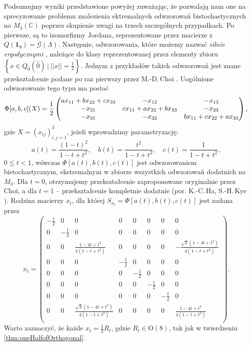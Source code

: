 \label{com:onlyOneExample}
Podsumujmy wyniki przedstawione powyżej zuważając, że pozwalają nam one
na sprecyzowanie problemu znalezienia ektremalnych odwzorowań bistochastycznych
no $M_{3}(\mathbb{C})$ poprzez skupienie uwagi na trzech szczególnych
przypadkach.
Po pierwsze, są to izomorfizmy Jordana, reprezentowane przez macierze z
$Q(\mathbf{1}_{8}) = \mathcal{G}(\Lambda)$.
Następnie, odwzorowania, które możemy nazwać \emph{silnie ergodycznymi}
\cite{miller2015stable},
należące do klasy reprezentowanej przez elementy zbioru
$\left \{ x \in Q_{0}(\hat{0}) \:|\: ||x|| = \frac{1}{2} \right \}$.
Jednym z przykładów takich odwzorowań jest znane przekształcenie podane
po raz pierwszy przez M.-D.\,Choi \cite{choi1977extremal}.
Uogólnione odwzorowanie tego typu ma postać
\begin{equation}\label{eq:choi}
\Phi[a,b,c](X)=\\
\frac{1}{2}
\begin{pmatrix}
ax_{11}+bx_{22}+cx_{33} & -x_{12} & -x_{13} \\
-x_{21} & cx_{11}+ax_{22}+bx_{33} & -x_{23} \\
-x_{31} & -x_{32} & bx_{11}+cx_{22}+ax_{33}
\end{pmatrix},
\end{equation}
gzie $X = (x_{ij})_{i,j = 1}^{3}$,
jeżeli wprowadzimy parametryzację:
\begin{equation}
 a(t)=\dfrac{(1-t)^2}{1-t+t^2},\quad b(t)=\dfrac{t^2}{1-t+t^2},\quad c(t)=\dfrac 1{1-t+t^2},
\end{equation}
$0 \leq t < 1$,
wówczas $\Phi[a(t), b(t), c(t)]$ jest odwzorowaniem bistochastycznym, ekstremalnym
w zbiorze wszystkich odwzorowań dodatnich na $M_{3}$.
Dla $t = 0$, otrzymujemy przekształcenie zaproponowane oryginalnie przez Choi,
a dla $t = 1$ -- przekształcenie kompletnie dodatnie
(por.
K.-C.\,Ha, S.-H.\,Kye \cite{ha2011entanglement}).
Rodzina macierzy $x_{t}$, dla której
$S_{x_{t}} = \Phi[a(t), b(t), c(t)]$ jest zadana przez
\begin{equation}
 x_{t} = \begin{pmatrix}
     - \frac{1}{2} & 0 & 0 & 0 & 0 & 0 & 0 & 0 \\
     0 & - \frac{1}{2} & 0 & 0 & 0 & 0 & 0 & 0 \\
     0 & 0 & \frac{1 - 4t + t^{2}}{4(1 - t + t^{2})} & 0 & 0 & 0 & 0 & - \frac{\sqrt{3}(1 - 4t + t^{2})}{4(1 - t + t^{2})} \\
     0 & 0 & 0 & - \frac{1}{2} & 0 & 0 & 0 & 0 \\
     0 & 0 & 0 & 0 & - \frac{1}{2} & 0 & 0 & 0 \\
     0 & 0 & 0 & 0 & 0 & - \frac{1}{2} & 0 & 0 \\
     0 & 0 & 0 & 0 & 0 & 0 & - \frac{1}{2} & 0 \\
     0 & 0 & \frac{\sqrt{3}(1 - 4t + t^{2})}{4(1 - t + t^{2})} & 0 & 0 & 0 & 0 & \frac{1 - 4t + t^{2}}{4(1 - t + t^{2})} \\
 \end{pmatrix}.
\end{equation}
Warto zaznaczyć, że każde
$x_{t} = \frac{1}{2} R_{t}$, gdzie $R_{t} \in \text{O}(8)$,
tak jak w twierdzeniu \ref{thm:oneHalfofOrthogonal}.

